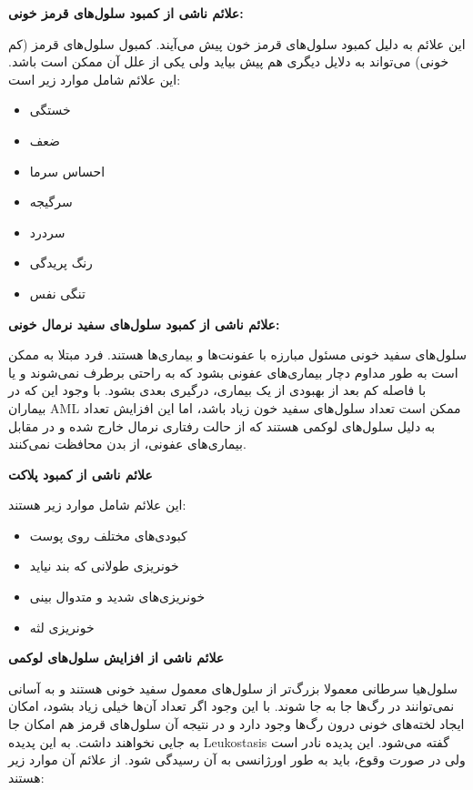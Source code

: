 \documentclass[12pt]{article}
\begin{document}
\textbf{علائم ناشی از کمبود سلول‌های قرمز خونی:}

این علائم به دلیل کمبود سلول‌های قرمز خون پیش‌ می‌آیند. کمبول سلول‌های قرمز (کم خونی) می‌تواند به دلایل دیگری هم پیش بیاید ولی یکی از علل آن ممکن است  باشد. این علائم شامل موارد زیر است:

\begin{itemize}
	\item خستگی
	
	\item ضعف
	
	\item احساس سرما
	
	\item سرگیجه
	
	\item سردرد
	
	\item رنگ پریدگی
	
	\item تنگی نفس
	
\end{itemize}


\textbf{علائم ناشی از کمبود سلول‌های سفید نرمال خونی:}

سلول‌های سفید خونی مسئول مبارزه با عفونت‌ها و بیماری‌ها هستند. فرد مبتلا به  ممکن است به طور مداوم دچار بیماری‌های عفونی بشود که به راحتی برطرف نمی‌شوند و یا با فاصله کم بعد از بهبودی از یک بیماری، درگیری بعدی بشود.  با وجود این که در بیماران AML ممکن است تعداد سلول‌های سفید خون زیاد باشد، اما این افزایش تعداد به دلیل سلول‌های لوکمی هستند که از حالت رفتاری نرمال خارج شده و در مقابل بیماری‌های عفونی، از بدن محافظت نمی‌کنند.

\textbf{علائم ناشی از کمبود پلاکت}

این علائم شامل موارد زیر هستند:

\begin{itemize}
	\item کبودی‌های مختلف روی پوست
	
	
	\item خونریزی طولانی که بند نیاید
	
	\item خونریزی‌های شدید و متدوال بینی
	
	\item خونریزی لثه
	
	
\end{itemize}


\textbf{علائم ناشی از افزایش سلول‌های لوکمی}

سلول‌هیا سرطانی  معمولا بزرگ‌تر از سلول‌های معمول سفید خونی هستند و به آسانی نمی‌توانند در رگ‌ها جا به جا شوند. با این وجود اگر تعداد آن‌ها خیلی زیاد بشود، امکان ایجاد لخته‌های خونی درون رگ‌ها وجود دارد و در نتیجه آن سلول‌های قرمز هم امکان جا به جایی نخواهند داشت. به این پدیده Leukostasis گفته می‌شود. این پدیده نادر است ولی در صورت وقوع، باید به طور اورژانسی به آن رسیدگی شود. از علائم آن موارد زیر هستند:
\end{document}
